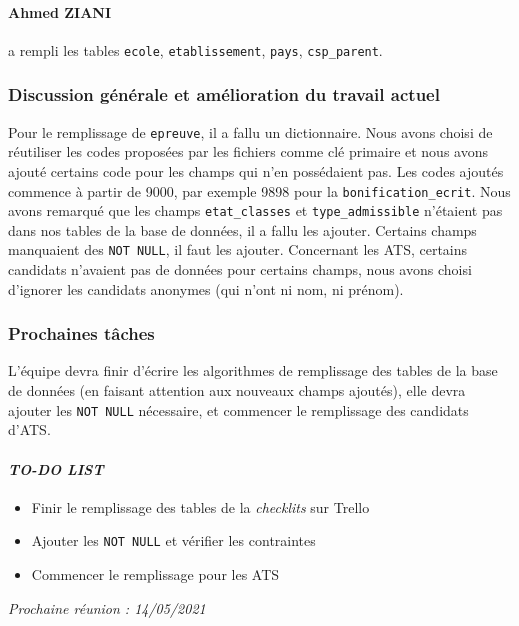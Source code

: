 \paragraph{Ahmed ZIANI} a rempli les tables \texttt{ecole}, \texttt{etablissement}, \texttt{pays}, \texttt{csp\_parent}.

\subsubsection*{Discussion générale et amélioration du travail actuel}
Pour le remplissage de \texttt{epreuve}, il a fallu un dictionnaire. Nous avons choisi de réutiliser les codes proposées par les fichiers comme clé primaire et nous avons ajouté certains code pour les champs qui n'en possédaient pas. Les codes ajoutés commence à partir de 9000, par exemple 9898 pour la \texttt{bonification\_ecrit}. Nous avons remarqué que les champs \texttt{etat\_classes} et \texttt{type\_admissible} n'étaient pas dans nos tables de la base de données, il a fallu les ajouter. Certains champs manquaient des \texttt{NOT NULL}, il faut les ajouter. Concernant les ATS, certains candidats n'avaient pas de données pour certains champs, nous avons choisi d'ignorer les candidats anonymes (qui n'ont ni nom, ni prénom).

\subsubsection*{Prochaines tâches}
L'équipe devra finir d'écrire les algorithmes de remplissage des tables de la base de données (en faisant attention aux nouveaux champs ajoutés), elle devra ajouter les \texttt{NOT NULL} nécessaire, et commencer le remplissage des candidats d'ATS.


\paragraph{\emph{TO-DO LIST}}
\begin{itemize}
    \item Finir le remplissage des tables de la \textsl{checklits} sur Trello
    \item Ajouter les \texttt{NOT NULL} et vérifier les contraintes
    \item Commencer le remplissage pour les ATS
    
\end{itemize}

\emph{Prochaine réunion : 14/05/2021}\\

% 